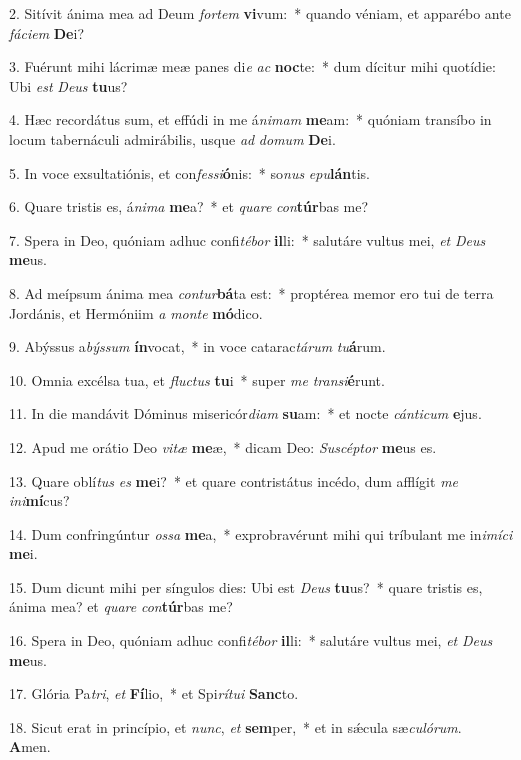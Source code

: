 2. Sitívit ánima mea ad Deum \textit{for}\textit{tem} \textbf{vi}vum:~*  quando véniam, et apparébo ante \textit{fá}\textit{ci}\textit{em} \textbf{De}i?\

3. Fuérunt mihi lácrimæ meæ panes di\textit{e} \textit{ac} \textbf{noc}te:~*  dum dícitur mihi quotídie: Ubi \textit{est} \textit{De}\textit{us} \textbf{tu}us?\

4. Hæc recordátus sum, et effúdi in me á\textit{ni}\textit{mam} \textbf{me}am:~*  quóniam transíbo in locum tabernáculi admirábilis, usque \textit{ad} \textit{do}\textit{mum} \textbf{De}i.\

5. In voce exsultatiónis, et con\textit{fes}\textit{si}\textbf{ó}nis:~*  so\textit{nus} \textit{e}\textit{pu}\textbf{lán}tis.\

6. Quare tristis es, á\textit{ni}\textit{ma} \textbf{me}a?~*  et \textit{qua}\textit{re} \textit{con}\textbf{túr}bas me?\

7. Spera in Deo, quóniam adhuc confi\textit{té}\textit{bor} \textbf{il}li:~*  salutáre vultus mei, \textit{et} \textit{De}\textit{us} \textbf{me}us.\

8. Ad meípsum ánima mea \textit{con}\textit{tur}\textbf{bá}ta est:~*  proptérea memor ero tui de terra Jordánis, et Hermóniim \textit{a} \textit{mon}\textit{te} \textbf{mó}dico.\

9. Abýssus a\textit{býs}\textit{sum} \textbf{ín}vocat,~*  in voce catarac\textit{tá}\textit{rum} \textit{tu}\textbf{á}rum.\

10. Omnia excélsa tua, et \textit{fluc}\textit{tus} \textbf{tu}i~*  super \textit{me} \textit{trans}\textit{i}\textbf{é}runt.\

11. In die mandávit Dóminus misericór\textit{di}\textit{am} \textbf{su}am:~*  et nocte \textit{cán}\textit{ti}\textit{cum} \textbf{e}jus.\

12. Apud me orátio Deo \textit{vi}\textit{tæ} \textbf{me}æ,~*  dicam Deo: \textit{Su}\textit{scép}\textit{tor} \textbf{me}us es.\

13. Quare oblí\textit{tus} \textit{es} \textbf{me}i?~*  et quare contristátus incédo, dum afflígit \textit{me} \textit{in}\textit{i}\textbf{mí}cus?\

14. Dum confringúntur \textit{os}\textit{sa} \textbf{me}a,~*  exprobravérunt mihi qui tríbulant me in\textit{i}\textit{mí}\textit{ci} \textbf{me}i.\

15. Dum dicunt mihi per síngulos dies: Ubi est \textit{De}\textit{us} \textbf{tu}us?~*  quare tristis es, ánima mea? et \textit{qua}\textit{re} \textit{con}\textbf{túr}bas me?\

16. Spera in Deo, quóniam adhuc confi\textit{té}\textit{bor} \textbf{il}li:~*  salutáre vultus mei, \textit{et} \textit{De}\textit{us} \textbf{me}us.\

17. Glória Pa\textit{tri}, \textit{et} \textbf{Fí}lio,~*  et Spi\textit{rí}\textit{tu}\textit{i} \textbf{Sanc}to.\

18. Sicut erat in princípio, et \textit{nunc}, \textit{et} \textbf{sem}per,~*  et in sǽcula sæ\textit{cu}\textit{ló}\textit{rum}. \textbf{A}men.\


